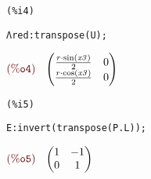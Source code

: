 \noindent
\begin{minipage}[t]{8ex}\color{red}\bf
\begin{verbatim}
(%i4) 
\end{verbatim}
\end{minipage}
\begin{minipage}[t]{\textwidth}\color{blue}
\begin{verbatim}
Λred:transpose(U);
\end{verbatim}
\end{minipage}

\noindent
\begin{math}\displaystyle
\parbox{8ex}{$\color{labelcolor}\mathrm{\tt (\%o4) }\quad $}
\begin{pmatrix}\frac{r\cdot \mathrm{sin}\left( \mathit{x3}\right) }{2} & 0\cr \frac{r\cdot \mathrm{cos}\left( \mathit{x3}\right) }{2} & 0\end{pmatrix}\mbox{}
\end{math}


\noindent
\begin{minipage}[t]{8ex}\color{red}\bf
\begin{verbatim}
(%i5) 
\end{verbatim}
\end{minipage}
\begin{minipage}[t]{\textwidth}\color{blue}
\begin{verbatim}
E:invert(transpose(P.L));
\end{verbatim}
\end{minipage}

\noindent
\begin{math}\displaystyle
\parbox{8ex}{$\color{labelcolor}\mathrm{\tt (\%o5) }\quad $}
\begin{pmatrix}1 & -1\cr 0 & 1\end{pmatrix}\mbox{}
\end{math}
